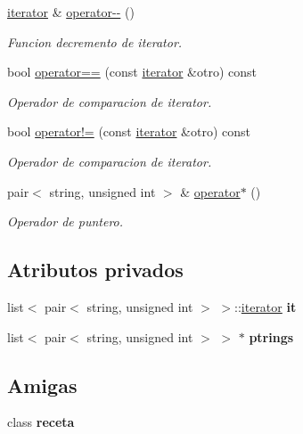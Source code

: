 \begin{DoxyCompactItemize}
\hyperlink{classreceta_1_1iterator}{iterator} \& \hyperlink{classreceta_1_1iterator_a3983fab3725f8a1fbf54987323bc9be1}{operator-\/-\/} ()
\begin{DoxyCompactList}\small\item\em Funcion decremento de iterator. \end{DoxyCompactList}\item 
bool \hyperlink{classreceta_1_1iterator_ae3b309ab89eebb443bb1328a56f0b7fb}{operator==} (const \hyperlink{classreceta_1_1iterator}{iterator} \&otro) const
\begin{DoxyCompactList}\small\item\em Operador de comparacion de iterator. \end{DoxyCompactList}\item 
bool \hyperlink{classreceta_1_1iterator_a08a0257876a2215954da163af770ca2d}{operator!=} (const \hyperlink{classreceta_1_1iterator}{iterator} \&otro) const
\begin{DoxyCompactList}\small\item\em Operador de comparacion de iterator. \end{DoxyCompactList}\item 
pair$<$ string, unsigned int $>$ \& \hyperlink{classreceta_1_1iterator_ab73e660fecde193949ccd9c509766f72}{operator$\ast$} ()
\begin{DoxyCompactList}\small\item\em Operador de puntero. \end{DoxyCompactList}\end{DoxyCompactItemize}
\subsection*{Atributos privados}
\begin{DoxyCompactItemize}
\item 
\mbox{\label{classreceta_1_1iterator_a8d33cb290442b42329679040828cdf64}} 
list$<$ pair$<$ string, unsigned int $>$ $>$\+::\hyperlink{classreceta_1_1iterator}{iterator} {\bfseries it}
\item 
\mbox{\label{classreceta_1_1iterator_a89b84a30ba72ff69052436586a31472f}} 
list$<$ pair$<$ string, unsigned int $>$ $>$ $\ast$ {\bfseries ptrings}
\end{DoxyCompactItemize}
\subsection*{Amigas}
\begin{DoxyCompactItemize}
\item 
\mbox{\label{classreceta_1_1iterator_a9843fe65258faad543f6aba1e066f9ac}} 
class {\bfseries receta}
\end{DoxyCompactItemize}


